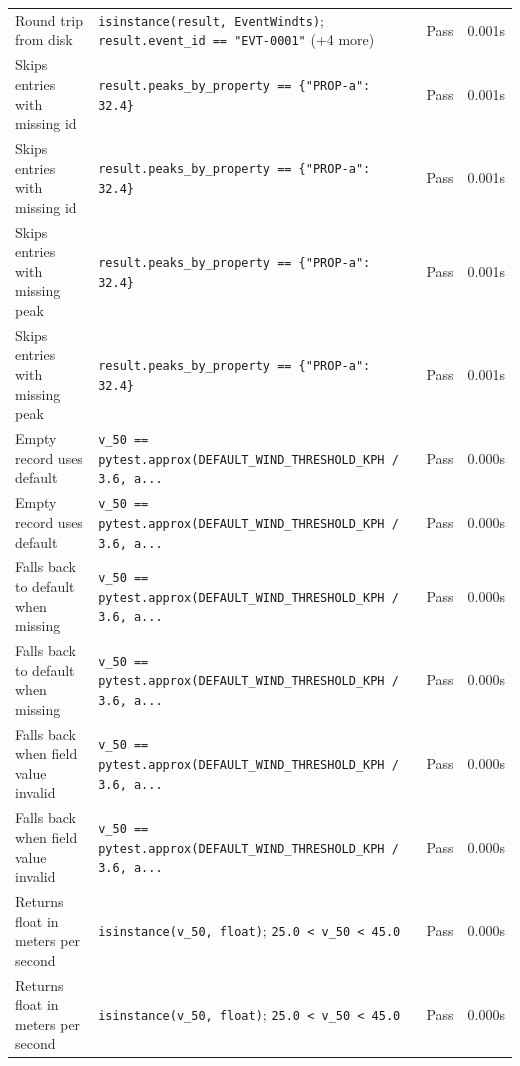 \documentclass[11pt,a4paper]{article}
\begin{document}
\begin{longtable}{p{6cm}p{5.5cm}cc}
    Round trip from disk & {\scriptsize \texttt{isinstance(result, EventWindts)}; \texttt{result.event\_id == "EVT-0001"} (+4 more)} & \textcolor{green!60!black}{Pass} & 0.001s \\
    Skips entries with missing id & {\scriptsize \texttt{result.peaks\_by\_property == \{"PROP-a": 32.4\}}} & \textcolor{green!60!black}{Pass} & 0.001s \\
    Skips entries with missing id & {\scriptsize \texttt{result.peaks\_by\_property == \{"PROP-a": 32.4\}}} & \textcolor{green!60!black}{Pass} & 0.001s \\
    Skips entries with missing peak & {\scriptsize \texttt{result.peaks\_by\_property == \{"PROP-a": 32.4\}}} & \textcolor{green!60!black}{Pass} & 0.001s \\
    Skips entries with missing peak & {\scriptsize \texttt{result.peaks\_by\_property == \{"PROP-a": 32.4\}}} & \textcolor{green!60!black}{Pass} & 0.001s \\
    Empty record uses default & {\scriptsize \texttt{v\_50 == pytest.approx(DEFAULT\_WIND\_THRESHOLD\_KPH / 3.6, a...}} & \textcolor{green!60!black}{Pass} & 0.000s \\
    Empty record uses default & {\scriptsize \texttt{v\_50 == pytest.approx(DEFAULT\_WIND\_THRESHOLD\_KPH / 3.6, a...}} & \textcolor{green!60!black}{Pass} & 0.000s \\
    Falls back to default when missing & {\scriptsize \texttt{v\_50 == pytest.approx(DEFAULT\_WIND\_THRESHOLD\_KPH / 3.6, a...}} & \textcolor{green!60!black}{Pass} & 0.000s \\
    Falls back to default when missing & {\scriptsize \texttt{v\_50 == pytest.approx(DEFAULT\_WIND\_THRESHOLD\_KPH / 3.6, a...}} & \textcolor{green!60!black}{Pass} & 0.000s \\
    Falls back when field value invalid & {\scriptsize \texttt{v\_50 == pytest.approx(DEFAULT\_WIND\_THRESHOLD\_KPH / 3.6, a...}} & \textcolor{green!60!black}{Pass} & 0.000s \\
    Falls back when field value invalid & {\scriptsize \texttt{v\_50 == pytest.approx(DEFAULT\_WIND\_THRESHOLD\_KPH / 3.6, a...}} & \textcolor{green!60!black}{Pass} & 0.000s \\
    Returns float in meters per second & {\scriptsize \texttt{isinstance(v\_50, float)}; \texttt{25.0 < v\_50 < 45.0}} & \textcolor{green!60!black}{Pass} & 0.000s \\
    Returns float in meters per second & {\scriptsize \texttt{isinstance(v\_50, float)}; \texttt{25.0 < v\_50 < 45.0}} & \textcolor{green!60!black}{Pass} & 0.000s \\

\end{longtable}
\end{document}
